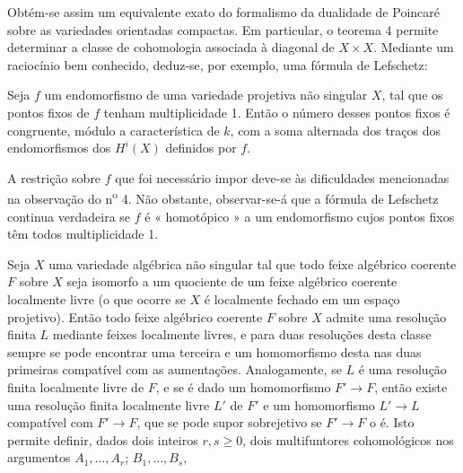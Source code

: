 Obtém-se assim um equivalente exato do formalismo da dualidade de Poincaré
sobre as variedades orientadas compactas. Em particular, o teorema 4 permite
determinar a classe de cohomologia associada à diagonal de $X\times X$. Mediante
um raciocínio bem conhecido, deduz-se, por exemplo, uma fórmula de Lefschetz:

 Seja $f$ um endomorfismo de uma variedade projetiva não
singular $X$, tal que os pontos fixos de $f$ tenham multiplicidade 1.
Então o número desses pontos fixos é congruente, módulo a característica de
$k$, com a soma alternada dos traços dos endomorfismos dos $H^{i}(X)$ definidos
por $f$.

A restrição sobre $f$ que foi necessário impor deve-se às dificuldades mencionadas na
observação do n\textsuperscript{o} 4. Não obstante, observar-se-á que a fórmula de
Lefschetz continua verdadeira se $f$ é « homotópico » a um endomorfismo cujos
pontos fixos têm todos multiplicidade 1.


Seja $X$ uma variedade algébrica não singular tal que todo feixe
algébrico coerente $F$ sobre $X$ seja isomorfo a um quociente de um feixe
algébrico coerente localmente livre (o que ocorre se $X$ é localmente
fechado em um espaço projetivo). Então todo feixe algébrico coerente $F$ sobre
$X$ admite uma resolução finita $L$ mediante feixes localmente livres, e para
duas resoluções desta classe sempre se pode encontrar uma terceira e um
homomorfismo desta nas duas primeiras compatível com as
aumentações. Analogamente, se $L$ é uma resolução finita localmente livre de
$F$, e se é dado um homomorfismo $F'\longrightarrow F$, então existe
uma resolução finita localmente livre $L'$ de $F'$ e um homomorfismo
$L'\longrightarrow L$ compatível com $F'\longrightarrow F$, que se pode
supor sobrejetivo se $F'\longrightarrow F$ o é. Isto permite definir, dados
dois inteiros $r,s\geq0$, dois multifuntores cohomológicos nos
argumentos $A_1,\ldots,A_r$; $B_1,\ldots,B_s$,


